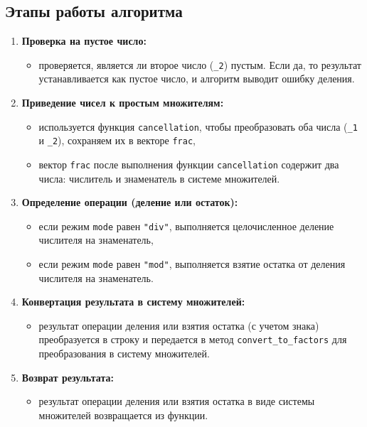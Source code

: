 \subsection*{Этапы работы алгоритма}
\begin{enumerate}
	\item \textbf{Проверка на пустое число:}
	\begin{itemize}
		\item проверяется, является ли второе число (\texttt{\_2}) пустым. Если да, то результат устанавливается как пустое число, и алгоритм выводит ошибку деления.
	\end{itemize}
	
	\item \textbf{Приведение чисел к простым множителям:}
	\begin{itemize}
		\item используется функция \texttt{cancellation}, чтобы преобразовать оба числа (\texttt{\_1} и \texttt{\_2}), сохраняем их в векторе \texttt{frac},
		\item вектор \texttt{frac} после выполнения функции \texttt{cancellation} содержит два числа: числитель и знаменатель в системе множителей.
	\end{itemize}
	
	\item \textbf{Определение операции (деление или остаток):}
	\begin{itemize}
		\item если режим \texttt{mode} равен \texttt{"div"}, выполняется целочисленное деление числителя на знаменатель,
		\item если режим \texttt{mode} равен \texttt{"mod"}, выполняется взятие остатка от деления числителя на знаменатель.
	\end{itemize}
	
	\item \textbf{Конвертация результата в систему множителей:}
	\begin{itemize}
		\item результат операции деления или взятия остатка (с учетом знака) преобразуется в строку и передается в метод \texttt{convert\_to\_factors} для преобразования в систему множителей.
	\end{itemize}
	
	\item \textbf{Возврат результата:}
	\begin{itemize}
		\item результат операции деления или взятия остатка в виде системы множителей возвращается из функции.
	\end{itemize}
\end{enumerate}


